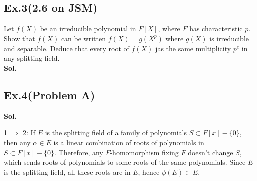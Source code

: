 \documentclass[lang=en,11pt,a4paper,citestyle =authoryear]{elegantpaper}
\begin{document}
\subsection*{Ex.3(2.6 on JSM)}
Let $f(X)$ be an irreducible polynomial in $F[X]$, where $F$ has characteristic $p$. Show that $f(X)$ can be written $f(X) = g(X^p)$ where $g(X)$ is irreducible and separable. Deduce that every root of $f(X)$ jas the same multiplicity $p^e$ in any splitting field.
\vspace{0.5em}\\
\textbf{Sol.} \par
\iffalse
    If $f(x)$ is irreducible, then $\gcd(f,f')=1$ unless $f'=0$.
\begin{enumerate}[\text{Case }1.]
\item $\gcd(f,f')=1$. Then, $f$ is separable and irreducible, hence $g(x^{p^e})=f(x)$ for $g=f$ and $e=0$.
\item $f'=0$. Then, $f(x)=g_0(x^p)$ for some $g_0$. Clearly, $g_0$ is irreducible. We show $g_0$ is separable. If not, $\gcd(g_0,g_0')\ne 1$ unless $g_0'=0$. If $g_0'\ne 0$, then there is $d$ such that $d\ |\ g_0$ and $d\ |\ g_0'$, contradicts with the irreducibility of $g_0$. Otherwise, $g_0'=0$, hence $g_0(x)=g_1(x^p)$ for some $g_1$. Then, $$f(x)=g_0(x^p)=g_1((x^p)^p)=g_1(x^{p^2}).$$
Similarly, $g_1$ is irreducible. Since $\deg g_0<\deg f$, in finite steps, we must have $f(x)=g_0(x^p)=g_m(x^{p^e})$ for some $e$. Then, $g_m$ is clearly irreducible. It is separable, since $g_m'\ne 0$. 

Then, we know $g(x)=\prod_{i=1}^{n}(x-x_i)$ in the splitting field of $g$ for some distinct roots $x_i$, where $n=\deg g$. For every $i$, let $\alpha_i$ be a root of $x^{p^e}-x_i$, then as a consequence of char$(F)=p$, we have $$(x-\alpha_i)^{p^e}=x^{p^e}-\alpha_i^{p^e}=x^{p^e}-x_i.$$ So,$$f(x)=\prod_i(x-\alpha_i)^{p^e}.$$
This proves the claim.
\end{enumerate}
\fi
\par 
\vspace{0.5em}

\subsection*{Ex.4(Problem A)}
\textbf{Sol.} \par
1 $\Rightarrow$ 2: If $E$ is the splitting field of a family of polynomials $S\subset F[x]-\{0\}$, then any $\alpha\in E$ is a linear combination of roots of polynomials in $S\subset F[x]-\{0\}$. Therefore, any $F$-homomorphism fixing $F$ doesn't change $S$, which sends roots of polynomials to some roots of the same polynomials. Since $E$ is the splitting field, all these roots are in $E$, hence $\phi(E)\subset E$.
\end{document}
